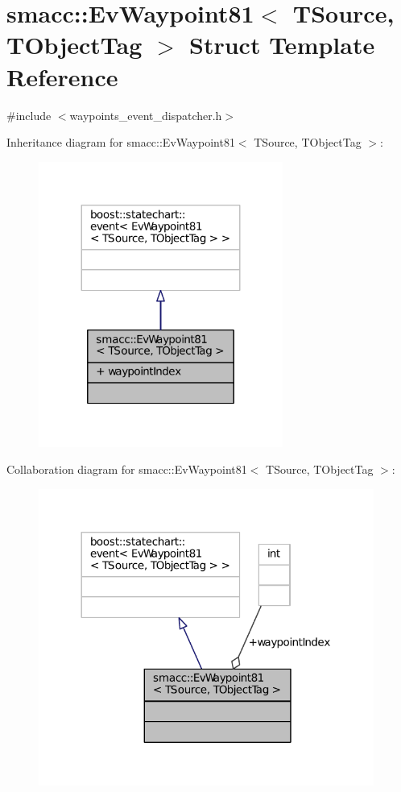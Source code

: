 \hypertarget{structsmacc_1_1EvWaypoint81}{}\section{smacc\+:\+:Ev\+Waypoint81$<$ T\+Source, T\+Object\+Tag $>$ Struct Template Reference}
\label{structsmacc_1_1EvWaypoint81}


{\ttfamily \#include $<$waypoints\+\_\+event\+\_\+dispatcher.\+h$>$}



Inheritance diagram for smacc\+:\+:Ev\+Waypoint81$<$ T\+Source, T\+Object\+Tag $>$\+:
\nopagebreak
\begin{figure}[H]
\begin{center}
\leavevmode
\includegraphics[width=227pt]{structsmacc_1_1EvWaypoint81__inherit__graph}
\end{center}
\end{figure}


Collaboration diagram for smacc\+:\+:Ev\+Waypoint81$<$ T\+Source, T\+Object\+Tag $>$\+:
\nopagebreak
\begin{figure}[H]
\begin{center}
\leavevmode
\includegraphics[width=312pt]{structsmacc_1_1EvWaypoint81__coll__graph}
\end{center}
\end{figure}
